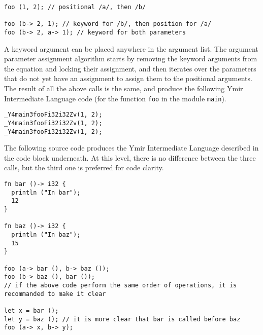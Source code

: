 \begin{lstlisting}[style=coloredverbatim]
foo (1, 2); // positional /a/, then /b/

foo (b-> 2, 1); // keyword for /b/, then position for /a/
foo (b-> 2, a-> 1); // keyword for both parameters
\end{lstlisting}

A keyword argument can be placed anywhere in the argument list. The argument
parameter assignment algorithm starts by removing the keyword arguments from the
equation and locking their assignment, and then iterates over the parameters
that do not yet have an assignment to assign them to the positional arguments.
The result of all the above calls is the same, and produce the following Ymir
Intermediate Language code (for the function \texttt{foo} in the module
\texttt{main}).

\begin{lstlisting}[style=intermediateVerb]
_Y4main3fooFi32i32Zv(1, 2);
_Y4main3fooFi32i32Zv(1, 2);
_Y4main3fooFi32i32Zv(1, 2);
\end{lstlisting}



The following source code produces the Ymir Intermediate Language described in
the code block underneath. At this level, there is no difference between the
three calls, but the third one is preferred for code clarity.

\begin{lstlisting}[style=coloredverbatim]
fn bar ()-> i32 {
  println ("In bar");
  12
}

fn baz ()-> i32 {
  println ("In baz");
  15
}

foo (a-> bar (), b-> baz ());
foo (b-> baz (), bar ());
// if the above code perform the same order of operations, it is recommanded to make it clear

let x = bar ();
let y = baz (); // it is more clear that bar is called before baz
foo (a-> x, b-> y);
\end{lstlisting}

